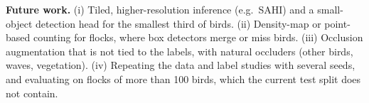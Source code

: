 \textbf{Future work.} (i) Tiled, higher-resolution inference (e.g.\ SAHI) and a small-object
detection head for the smallest third of birds. (ii) Density-map or point-based counting for
flocks, where box detectors merge or miss birds. (iii) Occlusion augmentation that is not tied
to the labels, with natural occluders (other birds, waves, vegetation). (iv) Repeating the data
and label studies with several seeds, and evaluating on flocks of more than 100 birds, which the
current test split does not contain.
